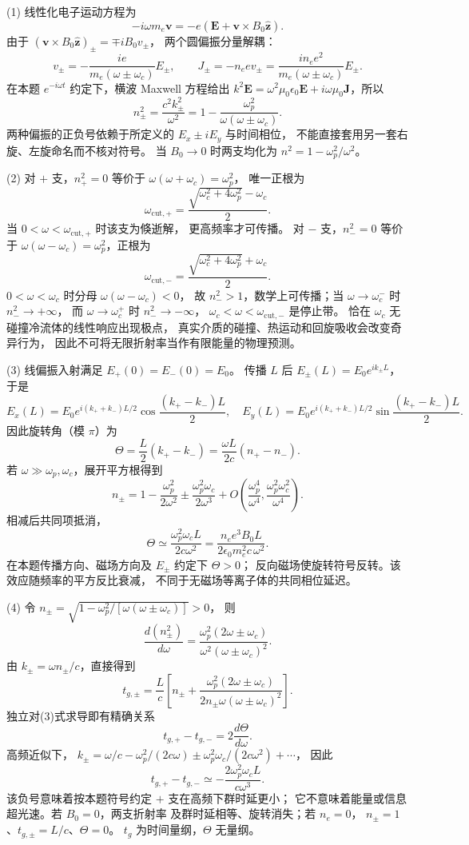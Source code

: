 (1) 线性化电子运动方程为
\[
 -i\omega m_e\mathbf v=-e(\mathbf E+\mathbf v\times B_0\hat{\mathbf z}).
\]
由于 \((\mathbf v\times B_0\hat{\mathbf z})_\pm=\mp iB_0v_\pm\)，
两个圆偏振分量解耦：
\[
 \boxed{v_\pm=-\frac{ie}{m_e(\omega\pm\omega_c)}E_\pm},\qquad
 \boxed{J_\pm=-n_e e v_\pm=
 \frac{i n_e e^2}{m_e(\omega\pm\omega_c)}E_\pm}.
\]
在本题 \(e^{-i\omega t}\) 约定下，横波 Maxwell 方程给出
\(k^2\mathbf E=\omega^2\mu_0\epsilon_0\mathbf E
+i\omega\mu_0\mathbf J\)，所以
\[
 \boxed{n_\pm^2=\frac{c^2k_\pm^2}{\omega^2}
 =1-\frac{\omega_p^2}{\omega(\omega\pm\omega_c)}}.
\]
两种偏振的正负号依赖于所定义的 \(E_x\pm iE_y\) 与时间相位，
不能直接套用另一套右旋、左旋命名而不核对符号。
当 \(B_0\to0\) 时两支均化为 \(n^2=1-\omega_p^2/\omega^2\)。

(2) 对 \(+\) 支，\(n_+^2=0\) 等价于
\(\omega(\omega+\omega_c)=\omega_p^2\)，
唯一正根为
\[
 \boxed{\omega_{\mathrm{cut},+}
 =\frac{\sqrt{\omega_c^2+4\omega_p^2}-\omega_c}{2}}.
\]
当 \(0<\omega<\omega_{\mathrm{cut},+}\) 时该支为倏逝解，
更高频率才可传播。
对 \(-\) 支，\(n_-^2=0\) 等价于
\(\omega(\omega-\omega_c)=\omega_p^2\)，正根为
\[
 \boxed{\omega_{\mathrm{cut},-}
 =\frac{\sqrt{\omega_c^2+4\omega_p^2}+\omega_c}{2}}.
\]
\(0<\omega<\omega_c\) 时分母 \(\omega(\omega-\omega_c)<0\)，
故 \(n_-^2>1\)，数学上可传播；当
\(\omega\to\omega_c^-\) 时 \(n_-^2\to+\infty\)，
而 \(\omega\to\omega_c^+\) 时 \(n_-^2\to-\infty\)，
\(\omega_c<\omega<\omega_{\mathrm{cut},-}\) 是停止带。
恰在 \(\omega_c\) 无碰撞冷流体的线性响应出现极点，
真实介质的碰撞、热运动和回旋吸收会改变奇异行为，
因此不可将无限折射率当作有限能量的物理预测。

(3) 线偏振入射满足 \(E_+(0)=E_-(0)=E_0\)。
传播 \(L\) 后
\(E_\pm(L)=E_0e^{ik_\pm L}\)，于是
\[
 E_x(L)=E_0e^{i(k_++k_-)L/2}
 \cos\frac{(k_+-k_-)L}{2},\quad
 E_y(L)=E_0e^{i(k_++k_-)L/2}
 \sin\frac{(k_+-k_-)L}{2}.
\]
因此旋转角（模 \(\pi\)）为
\[
 \boxed{\Theta=\frac{L}{2}(k_+-k_-)
 =\frac{\omega L}{2c}(n_+-n_-)}.
\]
若 \(\omega\gg\omega_p,\omega_c\)，展开平方根得到
\[
 n_\pm=1-\frac{\omega_p^2}{2\omega^2}
 \pm\frac{\omega_p^2\omega_c}{2\omega^3}
 +O\!\left(\frac{\omega_p^4}{\omega^4},
 \frac{\omega_p^2\omega_c^2}{\omega^4}\right).
\]
相减后共同项抵消，
\[
 \boxed{\Theta\simeq\frac{\omega_p^2\omega_cL}{2c\omega^2}
 =\frac{n_e e^3 B_0L}{2\epsilon_0m_e^2c\,\omega^2}}.
\]
在本题传播方向、磁场方向及 \(E_\pm\) 约定下 \(\Theta>0\)；
反向磁场使旋转符号反转。该效应随频率的平方反比衰减，
不同于无磁场等离子体的共同相位延迟。

(4) 令 \(n_\pm=\sqrt{1-\omega_p^2/[\omega(\omega\pm\omega_c)]}>0\)，
则
\[
 \frac{d(n_\pm^2)}{d\omega}
 =\frac{\omega_p^2(2\omega\pm\omega_c)}
 {\omega^2(\omega\pm\omega_c)^2}.
\]
由 \(k_\pm=\omega n_\pm/c\)，直接得到
\[
 \boxed{t_{g,\pm}=\frac Lc
 \left[n_\pm+
 \frac{\omega_p^2(2\omega\pm\omega_c)}
 {2n_\pm\omega(\omega\pm\omega_c)^2}\right]}.
\]
独立对(3)式求导即有精确关系
\[
 \boxed{t_{g,+}-t_{g,-}=2\frac{d\Theta}{d\omega}}.
\]
高频近似下，
\(k_\pm=\omega/c-\omega_p^2/(2c\omega)
\pm\omega_p^2\omega_c/(2c\omega^2)+\cdots\)，
因此
\[
 \boxed{t_{g,+}-t_{g,-}\simeq
 -\frac{2\omega_p^2\omega_cL}{c\omega^3}}.
\]
该负号意味着按本题符号约定 \(+\) 支在高频下群时延更小；
它不意味着能量或信息超光速。若 \(B_0=0\)，两支折射率
及群时延相等、旋转消失；若 \(n_e=0\)，
\(n_\pm=1\)、\(t_{g,\pm}=L/c\)、\(\Theta=0\)。
\(t_g\) 为时间量纲，\(\Theta\) 无量纲。
